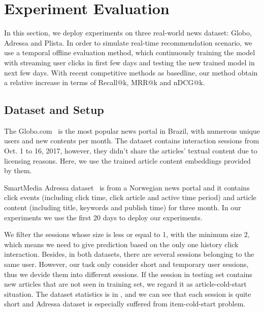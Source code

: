 \section{Experiment Evaluation}
In this section, we deploy experiments on three real-world news dataset: Globo, Adressa and Plista. In order to simulate real-time recommendation scenario, we use a temporal offline evaluation method, which continuously training the model with streaming user clicks in first few days and testing the new trained model in next few days. With recent competitive methods as basedline, our method obtain a relative increase in terms of Recall@k, MRR@k and nDCG@k.

\subsection{Dataset and Setup}
The Globo.com~\cite{moreira_news_2018} is the most popular news portal in Brazil, with numerous unique users and new contents per month. The dataset contains interaction sessions from Oct. 1 to 16, 2017, however, they didn't share the articles' textual content due to licensing reasons. Here, we use the trained article content embeddings provided by them.

SmartMedia Adressa dataset~\cite{gulla_adressa_2017} is from a Norwegian news portal and it contains click events (including click time, click article and active time period) and article content (including title, keywords and publish time) for three month. In our experiments we use the first 20 days to deploy our experiments. 


We filter the sessions whose size is less or equal to 1, with the minimum size 2, which means we need to give prediction based on the only one history click interaction. Besides, in both datasets, there are several sessions belonging to the same user. However, our task only consider short and temporary user sessions, thus we devide them into different sessions. If the session in testing set contains new articles that are not seen in training set, we regard it as article-cold-start situation. The dataset statistics is in , and we can see that each session is quite short and Adressa dataset is especially suffered from item-cold-start problem.

